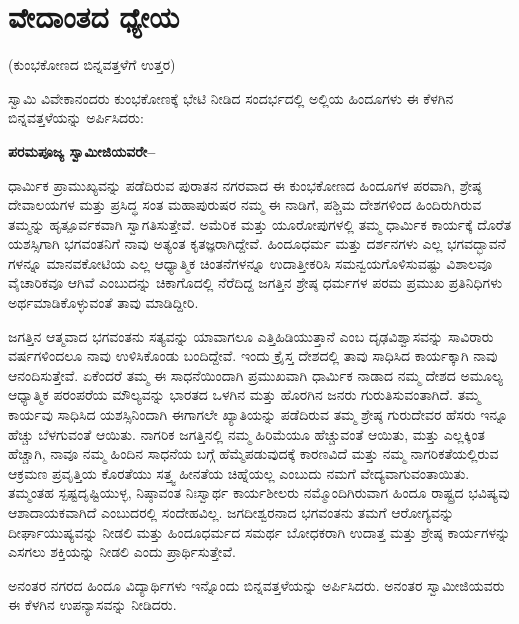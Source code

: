 
\chapter{ವೇದಾಂತದ ಧ್ಯೇಯ}

\begin{center}
(ಕುಂಭಕೋಣದ ಬಿನ್ನವತ್ತಳೆಗೆ ಉತ್ತರ)
\end{center}

ಸ್ವಾಮಿ ವಿವೇಕಾನಂದರು ಕುಂಭಕೋಣಕ್ಕೆ ಭೇಟಿ ನೀಡಿದ ಸಂದರ್ಭದಲ್ಲಿ ಅಲ್ಲಿಯ ಹಿಂದೂಗಳು ಈ ಕೆಳಗಿನ ಬಿನ್ನವತ್ತಳೆಯನ್ನು ಅರ್ಪಿಸಿದರು:

\textbf{ಪರಮಪೂಜ್ಯ ಸ್ವಾಮೀಜಿಯವರೇ–}

ಧಾರ್ಮಿಕ ಪ್ರಾಮುಖ್ಯವನ್ನು ಪಡೆದಿರುವ ಪುರಾತನ ನಗರವಾದ ಈ ಕುಂಭ\-ಕೋಣದ ಹಿಂದೂಗಳ ಪರವಾಗಿ, ಶ್ರೇಷ್ಠ ದೇವಾಲಯಗಳ ಮತ್ತು ಪ್ರಸಿದ್ಧ ಸಂತ ಮಹಾಪುರುಷರ ನಮ್ಮ ಈ ನಾಡಿಗೆ, ಪಶ್ಚಿಮ ದೇಶಗಳಿಂದ ಹಿಂದಿರುಗಿರುವ ತಮ್ಮನ್ನು ಹೃತ್ಪೂರ್ವಕವಾಗಿ ಸ್ವಾಗತಿಸುತ್ತೇವೆ. ಅಮೆರಿಕ ಮತ್ತು ಯೂರೋಪುಗಳಲ್ಲಿ ತಮ್ಮ ಧಾರ್ಮಿಕ ಕಾರ್ಯಕ್ಕೆ ದೊರೆತ ಯಶಸ್ಸಿಗಾಗಿ ಭಗವಂತನಿಗೆ ನಾವು ಅತ್ಯಂತ ಕೃತಜ್ಞ\-ರಾಗಿದ್ದೇವೆ. ಹಿಂದೂಧರ್ಮ ಮತ್ತು ದರ್ಶನಗಳು ಎಲ್ಲ ಭಗವದ್ಭಾವನೆ ಗಳನ್ನೂ ಮಾನವಕೋಟಿಯ ಎಲ್ಲ ಆಧ್ಯಾತ್ಮಿಕ ಚಿಂತನೆಗಳನ್ನೂ ಉದಾತ್ತೀಕರಿಸಿ ಸಮನ್ವಯ\-ಗೊಳಿಸುವಷ್ಟು ವಿಶಾಲವೂ ವೈಚಾರಿಕವೂ ಆಗಿವೆ ಎಂಬುದನ್ನು ಚಿಕಾಗೊದಲ್ಲಿ ನೆರೆದಿದ್ದ ಜಗತ್ತಿನ ಶ್ರೇಷ್ಠ ಧರ್ಮಗಳ ಪರಮ ಪ್ರಮುಖ ಪ್ರತಿನಿಧಿಗಳು ಅರ್ಥಮಾಡಿಕೊಳ್ಳುವಂತೆ ತಾವು ಮಾಡಿದ್ದೀರಿ. 

ಜಗತ್ತಿನ ಆತ್ಮವಾದ ಭಗವಂತನು ಸತ್ಯವನ್ನು ಯಾವಾಗಲೂ ಎತ್ತಿಹಿಡಿಯುತ್ತಾನೆ ಎಂಬ ದೃಢವಿಶ್ವಾಸವನ್ನು ಸಾವಿರಾರು ವರ್ಷಗಳಿಂದಲೂ ನಾವು ಉಳಿಸಿಕೊಂಡು ಬಂದಿದ್ದೇವೆ. ಇಂದು ಕ್ರೈಸ್ತ ದೇಶದಲ್ಲಿ ತಾವು ಸಾಧಿಸಿದ ಕಾರ್ಯಕ್ಕಾಗಿ ನಾವು ಆನಂದಿಸುತ್ತೇವೆ. ಏಕೆಂದರೆ ತಮ್ಮ ಈ ಸಾಧನೆಯಿಂದಾಗಿ ಪ್ರಮುಖವಾಗಿ ಧಾರ್ಮಿಕ ನಾಡಾದ ನಮ್ಮ ದೇಶದ ಅಮೂಲ್ಯ ಆಧ್ಯಾತ್ಮಿಕ ಪರಂಪರೆಯ ಮೌಲ್ಯವನ್ನು ಭಾರತದ ಒಳಗಿನ ಮತ್ತು ಹೊರಗಿನ ಜನರು ಗುರುತಿಸುವಂತಾಗಿದೆ. ತಮ್ಮ ಕಾರ್ಯವು ಸಾಧಿಸಿದ ಯಶಸ್ಸಿನಿಂದಾಗಿ ಈಗಾಗಲೇ ಖ್ಯಾತಿಯನ್ನು ಪಡೆದಿರುವ ತಮ್ಮ ಶ್ರೇಷ್ಠ ಗುರುದೇವರ ಹೆಸರು ಇನ್ನೂ ಹೆಚ್ಚು ಬೆಳಗುವಂತೆ ಆಯಿತು. ನಾಗರಿಕ ಜಗತ್ತಿನಲ್ಲಿ ನಮ್ಮ ಹಿರಿಮೆಯೂ ಹೆಚ್ಚುವಂತೆ ಆಯಿತು, ಮತ್ತು ಎಲ್ಲಕ್ಕಿಂತ ಹೆಚ್ಚಾಗಿ, ನಾವೂ ನಮ್ಮ ಹಿಂದಿನ ಸಾಧನೆಯ ಬಗ್ಗೆ ಹೆಮ್ಮೆಪಡುವುದಕ್ಕೆ ಕಾರಣವಿದೆ ಮತ್ತು ನಮ್ಮ ನಾಗರಿಕತೆಯಲ್ಲಿರುವ ಆಕ್ರಮಣ ಪ್ರವೃತ್ತಿಯ ಕೊರತೆಯು ಸತ್ತ್ವ ಹೀನತೆಯ ಚಿಹ್ನೆಯಲ್ಲ ಎಂಬುದು ನಮಗೆ ವೇದ್ಯವಾಗುವಂತಾಯಿತು. ತಮ್ಮಂತಹ ಸ್ಪಷ್ಟದೃಷ್ಟಿಯುಳ್ಳ, ನಿಷ್ಠಾವಂತ ನಿಃಸ್ವಾರ್ಥ ಕಾರ್ಯಶೀಲರು ನಮ್ಮೊಂದಿಗಿರುವಾಗ ಹಿಂದೂ ರಾಷ್ಟ್ರದ ಭವಿಷ್ಯವು ಆಶಾದಾಯಕವಾಗಿದೆ ಎಂಬುದರಲ್ಲಿ ಸಂದೇಹವಿಲ್ಲ. ಜಗದೀಶ್ವರನಾದ ಭಗವಂತನು ತಮಗೆ ಆರೋಗ್ಯವನ್ನು ದೀರ್ಘಾಯುಷ್ಯವನ್ನು ನೀಡಲಿ ಮತ್ತು ಹಿಂದೂಧರ್ಮದ ಸಮರ್ಥ ಬೋಧಕರಾಗಿ ಉದಾತ್ತ ಮತ್ತು ಶ್ರೇಷ್ಠ ಕಾರ್ಯಗಳನ್ನು ಎಸಗಲು ಶಕ್ತಿಯನ್ನು ನೀಡಲಿ ಎಂದು ಪ್ರಾರ್ಥಿಸುತ್ತೇವೆ. 

ಅನಂತರ ನಗರದ ಹಿಂದೂ ವಿದ್ಯಾರ್ಥಿಗಳು ಇನ್ನೊಂದು ಬಿನ್ನವತ್ತಳೆಯನ್ನು ಅರ್ಪಿಸಿದರು. ಅನಂತರ ಸ್ವಾಮೀಜಿಯವರು ಈ ಕೆಳಗಿನ ಉಪನ್ಯಾಸವನ್ನು ನೀಡಿದರು. 

